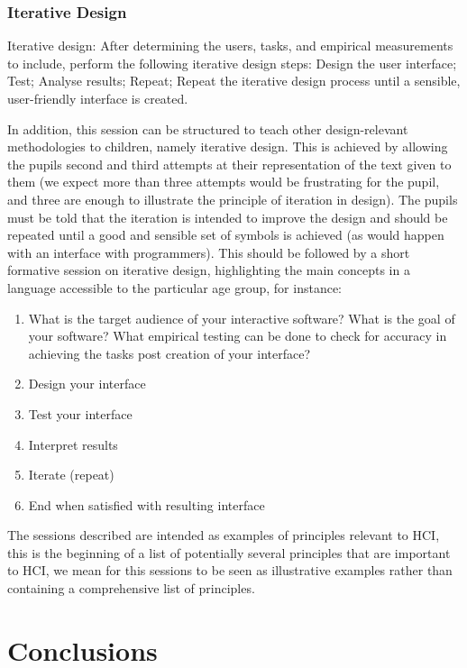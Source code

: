 \documentclass{sig-alternate}
\begin{document}
\subsubsection*{Iterative Design}

Iterative design: After determining the users, tasks, and empirical
measurements to include, perform the following iterative design steps:
Design the user interface; Test; Analyse results; Repeat; Repeat the
iterative design process until a sensible, user-friendly interface is
created.

In addition, this session can be structured to teach other
design-relevant methodologies to children, namely iterative
design. This is achieved by allowing the pupils second and third
attempts at their representation of the text given to them (we expect
more than three attempts would be frustrating for the pupil, and three
are enough to illustrate the principle of iteration in design). The
pupils must be told that the iteration is intended to improve the
design and should be repeated until a good and sensible set of symbols
is achieved (as would happen with an interface with programmers). This
should be followed by a short formative session on iterative design,
highlighting the main concepts in a language accessible to the
particular age group, for instance:

\begin{enumerate}
\item What is the target audience of your interactive software? What is the goal of your software? What empirical testing can be done to check for accuracy in achieving the tasks post creation of your interface?
\item Design your interface 
\item Test your interface
\item Interpret results
\item Iterate (repeat)
\item End when satisfied with resulting interface
\end{enumerate}

The sessions described are intended as examples of principles relevant
to HCI, this is the beginning of a list of potentially several
principles that are important to HCI, we mean for this sessions to be
seen as illustrative examples rather than containing a comprehensive
list of principles.


\section{Conclusions}
\end{document}
